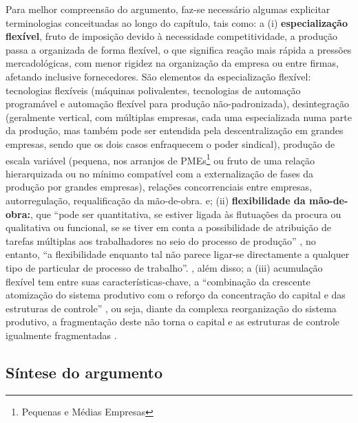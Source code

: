 \documentclass[hidelinks,a4paper,reprint,prl]{revtex4}
\begin{document}
	Para melhor compreensão do argumento, faz-se necessário algumas explicitar terminologias conceituadas ao longo do capítulo, tais como: a (i) \textbf{especialização flexível}, fruto de imposição devido à necessidade competitividade, a produção passa a organizada de forma flexível, o que significa reação mais rápida a pressões mercadológicas, com menor rigidez na organização da empresa ou entre firmas, afetando inclusive fornecedores. São elementos da especialização flexível: tecnologias flexíveis (máquinas polivalentes, tecnologias de automação programável e automação flexível para produção não-padronizada), desintegração (geralmente vertical, com múltiplas empresas, cada uma especializada numa parte da produção, mas também pode ser entendida pela descentralização em grandes empresas, sendo que os dois casos enfraquecem o poder sindical), produção de escala variável (pequena, nos arranjos de PMEs\footnote{Pequenas e Médias Empresas} ou fruto de uma relação hierarquizada ou no mínimo compatível com a externalização de fases da produção por grandes empresas), relações concorrenciais entre empresas, autorregulação, requalificação da mão-de-obra. \cite[p.104--106]{martinelli1994} e; (ii) \textbf{flexibilidade da mão-de-obra:}, que ``pode ser quantitativa, se estiver ligada às flutuações da procura ou qualitativa ou funcional, se se tiver em conta a possibilidade de atribuição de tarefas múltiplas aos trabalhadores no seio do processo de produção'' \cite[p.107]{martinelli1994}, no entanto, ``a flexibilidade enquanto tal não parece ligar-se directamente a qualquer tipo de particular de processo de trabalho''. \cite[p.107]{martinelli1994}, além disso; a (iii) acumulação flexível tem entre suas características-chave, a ``combinação da crescente atomização do sistema produtivo com o reforço da concentração do capital e das estruturas de controle'' \cite[p.115]{martinelli1994}, ou seja, diante da complexa reorganização do sistema produtivo, a fragmentação deste não torna o capital e as estruturas de controle igualmente fragmentadas \cite[p.114]{martinelli1994}.
	
	\subsection{Síntese do argumento}
	
\end{document}

